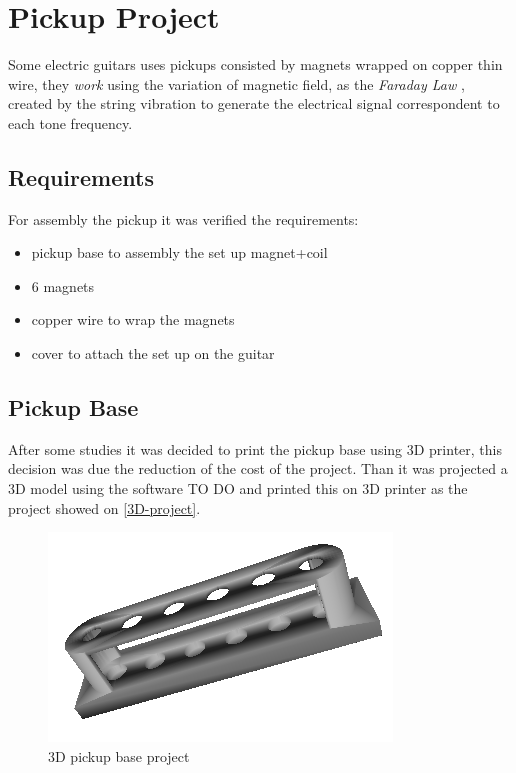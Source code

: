 \chapter{Pickup Project}
\label{pickup-project}

Some electric guitars uses pickups consisted by magnets wrapped on copper thin wire, they
\textit{work} \cite{pickup-work} using the variation of magnetic field, as the \textit{Faraday Law}
\cite{faraday-law}, created by the string vibration to generate the electrical signal correspondent
to each tone frequency.

\section{Requirements}
For assembly the pickup it was verified the requirements:

{\begin{itemize}
  \item pickup base to assembly the set up magnet+coil
  \item 6 magnets
  \item copper wire to wrap the magnets
  \item cover to attach the set up on the guitar
\end{itemize}}

\section{Pickup Base}
After some studies it was decided to print the pickup base using 3D printer, this
decision was due the reduction of the cost of the project. Than it was projected a 3D
model using the software TO DO and printed this on 3D printer as the project showed
on \autoref{3D-project}.

\begin{figure}[!htpb]
\centering
\caption{3D pickup base project}
\label{3D-project}
\includegraphics[scale=0.5]{images/pickup}
\end{figure}

